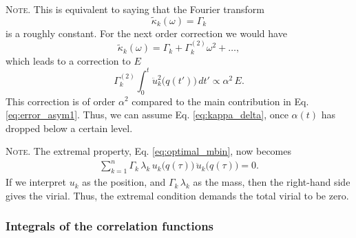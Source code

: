 \documentclass[reprint]{revtex4-1}
\newcommand{\note}[1]{{\color{DarkGreen}\footnotesize \textsc{Note.} #1}}
\newcommand{\Err}{E}
\begin{document}
\note{This is equivalent to saying that the Fourier transform
  $$
  \tilde \kappa_k(\omega) = \Gamma_k
  $$
  is a roughly constant.
  For the next order correction we would have
  $$
  \tilde \kappa_k(\omega) = \Gamma_k + \Gamma^{(2)}_k \omega^2 + \dots,
  $$
  which leads to a correction to $\Err$
  $$
  \Gamma^{(2)}_k
  \int_0^t \ddot u_k^2\bigl( q(t') \bigr) \, dt'
  \propto
  \alpha^2 \, \Err.
  $$
  This correction is of order $\alpha^2$
  compared to the main contribution in Eq. \eqref{eq:error_asym1}.
  Thus, we can assume Eq. \eqref{eq:kappa_delta},
  once $\alpha(t)$ has dropped below a certain level.
}

\note{
  The extremal property, Eq. \eqref{eq:optimal_mbin},
  now becomes
  \begin{align}
    \sum_{k = 1}^n
      \Gamma_k \, \lambda_k \,
      u_k\bigl( q(\tau) \bigr) \,
      \ddot u_k\bigl( q(\tau) \bigr) = 0.
    \label{eq:optimal_mbin1}
  \end{align}
  If we interpret $u_k$ as the position,
  and $\Gamma_k \, \lambda_k$ as the mass,
  then the right-hand side gives the virial.
  Thus, the extremal condition demands
  the total virial to be zero.
  $$\,$$
}



\subsubsection{Integrals of the correlation functions}
\end{document}
